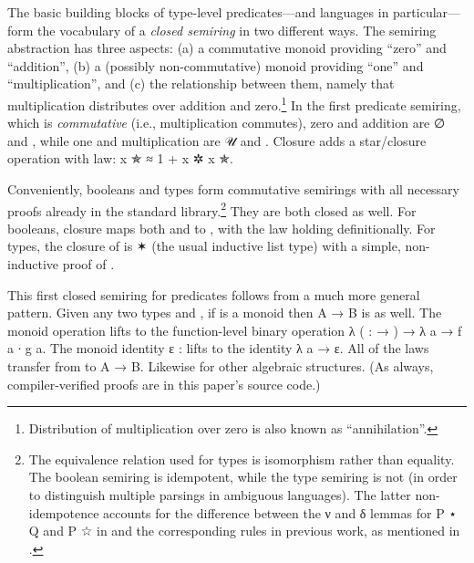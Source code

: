 \documentclass[acmsmall,screen,timestamp]{acmart}  %
\begin{document}


The basic building blocks of type-level predicates---and languages in particular---form the vocabulary of a \emph{closed semiring} in two different ways.
The semiring abstraction has three aspects: (a) a commutative monoid providing ``zero'' and ``addition'', (b) a (possibly non-commutative) monoid providing ``one'' and ``multiplication'', and (c) the relationship between them, namely that multiplication distributes over addition and zero.\footnote{Distribution of multiplication over zero is also known as ``annihilation''.}
In the first predicate semiring, which is \emph{commutative} (i.e., multiplication commutes), zero and addition are \AF ∅ and , while one and multiplication are \AF 𝒰 and .
Closure adds a star/closure operation  with  law: {\AB x \AF ✯ \AF ≈ 1 \AF + \AB x \AF ✲ \AB x \AF ✯}.

Conveniently, booleans and types form commutative semirings with all necessary proofs already in the standard library.\footnote{The equivalence relation used for types is isomorphism rather than equality.
The boolean semiring is idempotent, while the type semiring is not (in order to distinguish multiple parsings in ambiguous languages).
The latter non-idempotence accounts for the difference between the \AF ν and \AF δ lemmas for {\AB P ⋆ \AB Q} and {\AB P ☆} in  and the corresponding rules in previous work, as mentioned in .}
They are both closed as well.
For booleans, closure maps both  and  to , with the  law holding definitionally.
For types, the closure of  is { ✶} (the usual inductive list type) with a simple, non-inductive proof of .

This first closed semiring for predicates follows from a much more general pattern.
Given any two types  and , if  is a monoid then {\AB A \AS → \AB B} is as well.
The monoid operation  lifts to the function-level binary operation {\AS λ (  :  \AS → ) \AS → \AS λ \AB a \AS → \AB f \AB a \AB ∙ \AB g \AB a}.
The monoid identity {\AB ε \AS : } lifts to the identity {\AS λ \AB a \AS → \AB ε}.
All of the laws transfer from  to {\AB A \AS → \AB B}.
Likewise for other algebraic structures.
(As always, compiler-verified proofs are in this paper's source code.)
\end{document}
